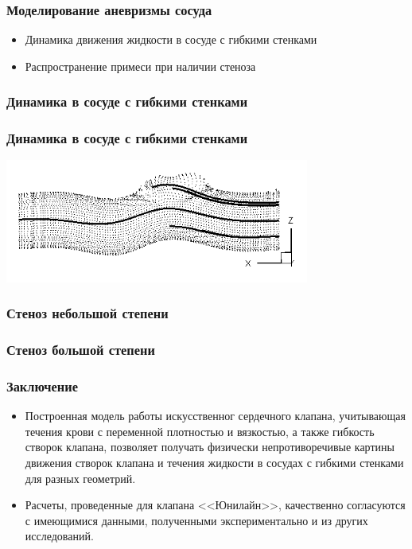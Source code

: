 \documentclass[14pt]{beamer}
\begin{document}
\begin{frame}
\frametitle{Моделирование аневризмы сосуда}
    \begin{itemize}
        \item[\MVRightarrow] Динамика движения жидкости в сосуде с гибкими стенками
        \item[\MVRightarrow] Распространение примеси при наличии стеноза
    \end{itemize}
\end{frame}

\begin{frame}
\frametitle{Динамика в сосуде с гибкими стенками}
\end{frame}

\begin{frame}
\frametitle{Динамика в сосуде с гибкими стенками}
    \begin{center}
        \includegraphics[width=10cm]{aneurysm_tracks.png}
    \end{center}
\end{frame}

\begin{frame}
\frametitle{Стеноз небольшой степени}
\end{frame}

\begin{frame}
\frametitle{Стеноз большой степени}
\end{frame}

\begin{frame}
\frametitle{Заключение}
    \begin{itemize}
        \item[\MVRightarrow] Построенная модель работы искусственног сердечного
            клапана, учитывающая течения крови с переменной плотностью и
            вязкостью, а также гибкость створок клапана, позволяет получать физически непротиворечивые картины движения створок клапана и течения жидкости в сосудах с гибкими стенками для разных геометрий.
        \item[\MVRightarrow] Расчеты, проведенные для клапана <<Юнилайн>>,
            качественно согласуются с имеющимися данными, полученными
            экспериментально и из других исследований.
    \end{itemize}
\end{frame}
\end{document}
